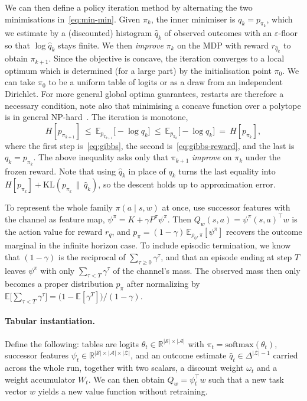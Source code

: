 \documentclass[11pt]{article}
\theoremstyle{remark}
\newcommand{\Acal}{\mathcal A}
\newcommand{\Scal}{\mathcal S}
\newcommand{\Zcal}{\mathcal Z}
\newcommand{\E}{\mathbb E}
\newcommand{\1}{\mathds{1}}
\newcommand{\pz}{p_{\pi}}
\newcommand{\Hf}[1]{H\!\left[#1\right]}
\begin{document}
We can then define a policy iteration method by alternating the two minimisations in~\eqref{eq:min-min}.
Given $\pi_k$, the inner minimiser is $q_k=p_{\pi_k}$, which we estimate by a (discounted) histogram $\hat q_k$ of observed outcomes with an $\varepsilon$-floor so that $\log\hat q_k$ stays finite.
We then \emph{improve} $\pi_k$ on the MDP with reward $r_{\hat q_k}$ to obtain $\pi_{k+1}$.
Since the objective is concave, the iteration converges to a local optimum which is determined (for a large part) by the initialisation point $\pi_0$.
We can take $\pi_0$ to be a uniform table of logits or as a draw from an independent Dirichlet.
For more general global optima guarantees, restarts are therefore a necessary condition, note also that minimising a concave function over a polytope is in general NP-hard~\citep{Pardalos-quadratic91}.
The iteration is monotone,
\begin{equation}
  \Hf{p_{\pi_{k+1}}}
  \ \le\ \E_{p_{\pi_{k+1}}}\big[-\log q_k\big]
  \ \le\ \E_{p_{\pi_k}}\big[-\log q_k\big]
  \ =\ \Hf{p_{\pi_k}},
  \label{eq:mm-descent}
\end{equation}
where the first step is~\eqref{eq:gibbs}, the second is~\eqref{eq:gibbs-reward}, and the last is $q_k=p_{\pi_k}$.
The above inequality asks only that $\pi_{k+1}$ \emph{improve} on $\pi_k$ under the frozen reward.
Note that using $\hat q_k$ in place of $q_k$ turns the last equality into $\Hf{p_{\pi_k}}+\mathrm{KL}(p_{\pi_k}\,\|\,\hat q_k)$, so the descent holds up to approximation error.

To represent the whole family $\pi(a\mid s,w)$ at once, use successor features with the channel as feature map, $\psi^\pi=K+\gamma P^\pi\psi^\pi$.
Then $Q_w(s,a)=\psi^\pi(s,a)^\top w$ is the action value for reward $r_q$, and $\pz=(1-\gamma)\,\E_{\rho_0,\pi}[\psi^\pi]$ recovers the outcome marginal in the infinite horizon case.
To include episodic termination, we know that $(1-\gamma)$ is the reciprocal of $\sum_{\tau\ge0}\gamma^{\tau}$, and that an episode ending at step $T$ leaves $\psi^\pi$ with only $\sum_{\tau<T}\gamma^{\tau}$ of the channel's mass.
The observed mass then only becomes a proper distribution $\pz$ after normalizing by $\E\big[\sum_{\tau<T}\gamma^{\tau}\big]=\big(1-\E[\gamma^{T}]\big)/(1-\gamma)$.



\paragraph{Tabular instantiation.}
Define the following: tables are logits $\theta_t\in\mathbb R^{|\Scal|\times|\Acal|}$ with $\pi_t=\mathrm{softmax}(\theta_t)$, successor features $\psi_t\in\mathbb R^{|\Scal|\times|\Acal|\times|\Zcal|}$, and an outcome estimate $\hat q_t\in\Delta^{|\Zcal|-1}$ carried across the whole run, together with two scalars, a discount weight $\omega_t$ and a weight accumulator $W_t$.
We can then obtain $Q_w=\psi_t^\top w$ such that a new task vector $w$ yields a new value function without retraining.
\end{document}
